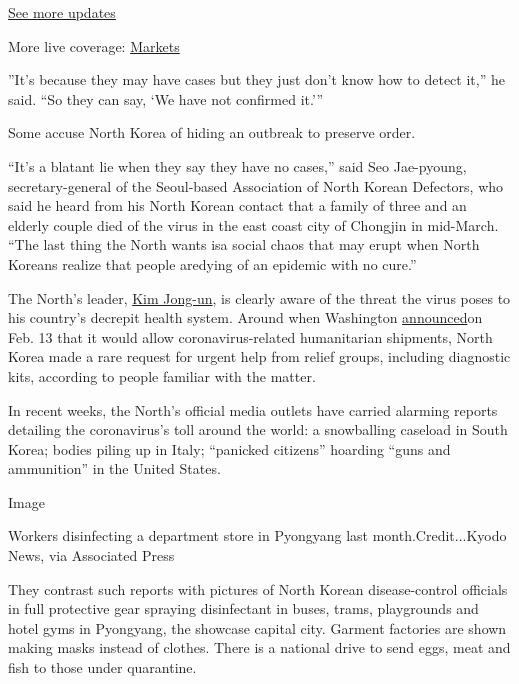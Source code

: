 \href{https://www.nytimes3xbfgragh.onion/2020/08/21/world/covid-19-coronavirus.html?action=click\&pgtype=Article\&state=default\&region=MAIN_CONTENT_1\&context=storylines_live_updates}{See
more updates}

More live coverage:
\href{https://www.nytimes3xbfgragh.onion/live/2020/08/20/business/stock-market-today-coronavirus?action=click\&pgtype=Article\&state=default\&region=MAIN_CONTENT_1\&context=storylines_live_updates}{Markets}

​''​It's because they may have cases but they just don't know how to
detect it,'' he said. ``So they can say, `We have not confirmed it​.'''

Some accuse North Korea of hiding an outbreak​ to preserve order.

``It's a blatant lie when they say they have no cases,'' said Seo
Jae-pyoung, secretary-general of the Seoul-based Association of North
Korean Defectors, who said he heard from his North Korean contact that a
family of three and an elderly couple died of the virus in the east
coast city of Chongjin in mid-March. ``The last thing ​the North wants
is ​a ​social chaos ​that may erupt ​when North Koreans realize that
people are ​dying of an epidemic with no cure​.''

The North's leader,
\href{https://www.nytimes3xbfgragh.onion/2020/04/26/world/asia/kim-jong-un-absence-north-korea.html}{Kim
Jong-un}, is clearly aware of the threat the virus poses to his
country​'s decrepit health system. Around when Washington
\href{https://www.nytimes3xbfgragh.onion/2020/02/14/world/asia/coronavirus-north-korea-sanctions.html}{announced}on
Feb. 13 that it would allow coronavirus-related ​humanitarian
shipments​, North Korea made a rare request for urgent help from relief
groups, including diagnostic kits, according to people familiar with the
matter.

​In recent weeks, the North's official media outlets have ​carried
alarming reports detailing the coronavirus's toll around the world: a
snowballing caseload in South Korea; bodies piling up in Italy;
``panicked citizens'' hoarding ``guns and ammunition''​ in the United
States.

Image

Workers disinfecting a department store in Pyongyang last
month.Credit...Kyodo News, via Associated Press

They contrast such reports with pictures of North Korean disease-control
officials in full protective gear spraying disinfectant in buses, trams,
playgrounds and hotel gyms in Pyongyang, the showcase capital city.
Garment factories are shown making masks instead of clothes. There is a
national drive to send eggs, meat and fish to those under quarantine.

